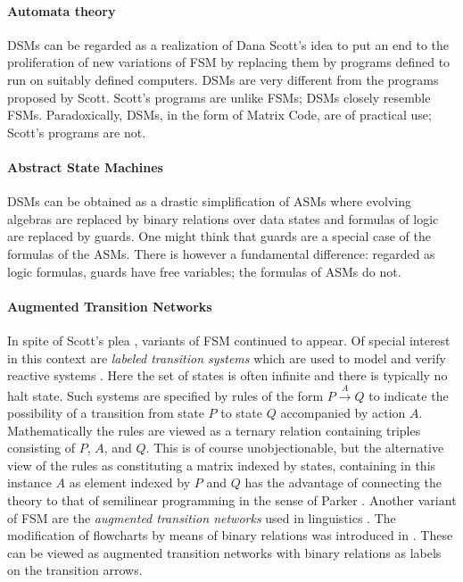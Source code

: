 \documentclass[preprint,11pt]{elsarticle}
\begin{document}
\paragraph{Automata theory}
DSMs can be regarded as a realization
of Dana Scott's idea
\cite{sctt67} to put an end to the proliferation
of new variations of FSM by replacing them by programs
defined to run on suitably defined computers.
DSMs are very different from the programs proposed by
Scott. Scott's programs are unlike FSMs; DSMs closely
resemble FSMs. Paradoxically, DSMs, in the form
of Matrix Code, are of practical use;
Scott's programs are not.

\paragraph{Abstract State Machines}
DSMs can be obtained as a drastic simplification of
ASMs \cite{brgr03} where evolving algebras are
replaced by binary relations over data states and
formulas of logic are replaced by guards.
One might think that guards are a special case
of the formulas of the ASMs.
There is however a fundamental difference: regarded
as logic formulas, guards have free variables;
the formulas of ASMs do not.

\paragraph{Augmented Transition Networks}
In spite of Scott's plea \cite{sctt67}, variants of
FSM continued to appear.
Of special interest in this context are
\emph{labeled transition systems} which are used
to model and verify reactive systems \cite{brktn08}.
Here the set of states is often infinite
and there is typically no halt state.
Such systems are specified by rules of the
form $P \stackrel{A}{\rightarrow} Q$
to indicate the possibility of a transition from
state $P$ to state $Q$ accompanied by action $A$.
Mathematically the rules are viewed as a ternary relation
containing triples consisting of $P$, $A$, and $Q$.
This is of course unobjectionable,
but the alternative view of the rules as constituting
a matrix indexed by states,
containing in this instance $A$ as element indexed
by $P$ and $Q$ has the advantage of connecting
the theory to that of semilinear programming
in the sense of Parker \cite{prkr87}.
Another variant of FSM are the \emph{augmented transition networks}
used in linguistics \cite{wds70}.
The modification of flowcharts by means of binary relations
was introduced in \cite{vnmdn79}.
These can be viewed as augmented transition networks
with binary relations as labels on the transition arrows. 
\end{document}

